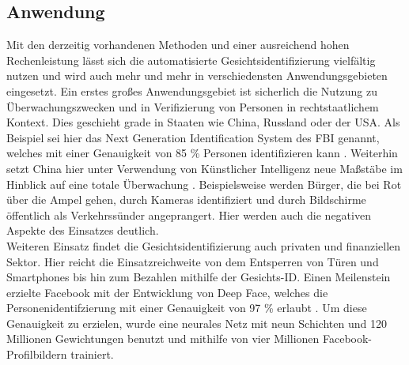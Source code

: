 \documentclass[doktyp=semarbeit, sprache=german]{TUBAFarbeiten}
\begin{document}
\subsection{Anwendung}
Mit den derzeitig vorhandenen Methoden und einer ausreichend hohen Rechenleistung lässt sich die automatisierte Gesichtsidentifizierung vielfältig nutzen und wird auch mehr und mehr in verschiedensten Anwendungsgebieten eingesetzt. Ein erstes großes Anwendungsgebiet ist sicherlich die Nutzung zu Überwachungszwecken und in Verifizierung von Personen in rechtstaatlichem Kontext. Dies geschieht grade in Staaten wie China, Russland oder der USA. Als Beispiel sei hier das \glqq Next Generation Identification System\grqq{} des FBI genannt, welches mit einer Genauigkeit von 85 \% Personen identifizieren kann \cite{FBI}. Weiterhin setzt China hier unter Verwendung von Künstlicher Intelligenz neue Maßstäbe im Hinblick auf eine totale Überwachung \cite{China}. Beispielsweise werden Bürger, die bei Rot über die Ampel gehen, durch Kameras identifiziert und durch Bildschirme öffentlich als Verkehrssünder angeprangert. Hier werden auch die negativen Aspekte des Einsatzes deutlich.
\\Weiteren Einsatz findet die Gesichtsidentifizierung auch privaten und finanziellen Sektor. Hier reicht die Einsatzreichweite von dem Entsperren von Türen und Smartphones bis hin zum Bezahlen mithilfe der Gesichts-ID.
Einen Meilenstein erzielte Facebook mit der Entwicklung von \glqq Deep Face\grqq{}, welches die Personenidentifzierung mit einer Genauigkeit von 97 \% erlaubt \cite{DeepFace}. Um diese Genauigkeit zu erzielen, wurde eine neurales Netz mit neun Schichten und 120 Millionen Gewichtungen benutzt und mithilfe von vier Millionen Facebook-Profilbildern trainiert.
\end{document}
